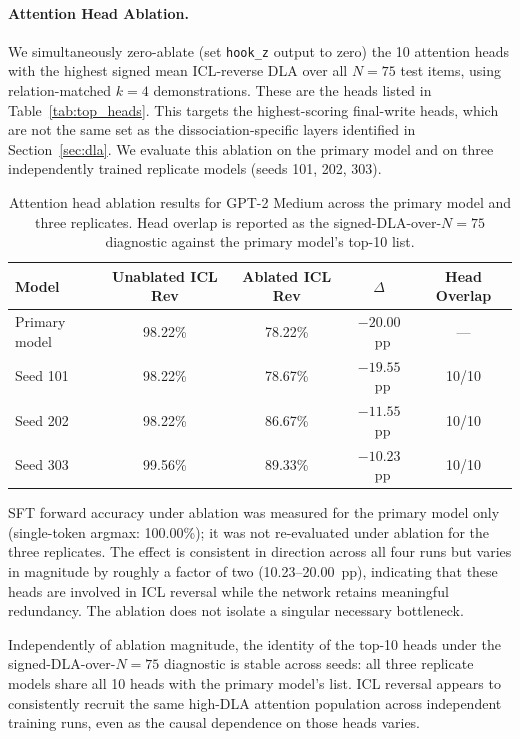 \documentclass[11pt]{article}
\begin{document}
\paragraph{Attention Head Ablation.}
We simultaneously zero-ablate (set \texttt{hook\_z} output to zero) the 10
attention heads with the highest signed mean ICL-reverse DLA over all $N=75$
test items, using relation-matched $k=4$ demonstrations. These are the heads
listed in Table~\ref{tab:top_heads}. This targets the highest-scoring
final-write heads, which are not the same set as the dissociation-specific
layers identified in Section~\ref{sec:dla}. We evaluate this ablation on the
primary model and on three independently trained replicate models (seeds 101,
202, 303).

\begin{table}[H]
\centering
\caption{Attention head ablation results for GPT-2 Medium across the primary
model and three replicates. Head overlap is reported as the signed-DLA-over-$N=75$
diagnostic against the primary model's top-10 list.}
\label{tab:ablation_results}
\begin{tabular}{lcccc}
\toprule
\textbf{Model} & \textbf{Unablated ICL Rev} & \textbf{Ablated ICL Rev} & \textbf{$\Delta$} & \textbf{Head Overlap} \\
\midrule
Primary model & 98.22\% & 78.22\% & $-20.00$~pp & --- \\
Seed 101      & 98.22\% & 78.67\% & $-19.55$~pp & 10/10 \\
Seed 202      & 98.22\% & 86.67\% & $-11.55$~pp & 10/10 \\
Seed 303      & 99.56\% & 89.33\% & $-10.23$~pp & 10/10 \\
\bottomrule
\end{tabular}
\end{table}

SFT forward accuracy under ablation was measured for the primary model only
(single-token argmax: 100.00\%); it was not re-evaluated under ablation for the
three replicates. The effect is consistent in direction across all four runs but
varies in magnitude by roughly a factor of two (10.23--20.00~pp), indicating
that these heads are involved in ICL reversal while the network retains
meaningful redundancy. The ablation does not isolate a singular necessary
bottleneck.

Independently of ablation magnitude, the identity of the top-10 heads under the
signed-DLA-over-$N=75$ diagnostic is stable across seeds: all three replicate
models share all 10 heads with the primary model's list. ICL reversal appears
to consistently recruit the same high-DLA attention population across independent
training runs, even as the causal dependence on those heads varies.
\end{document}
